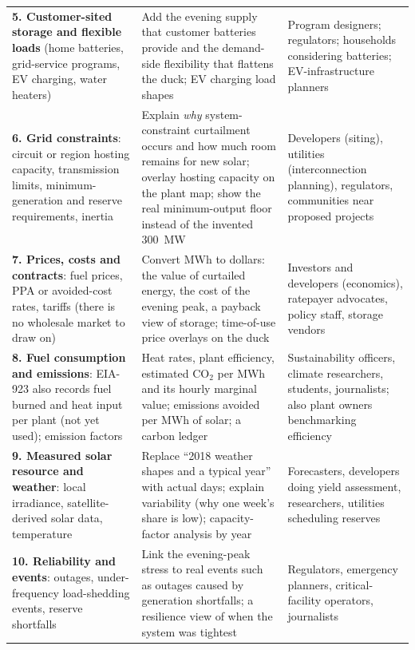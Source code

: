 \documentclass[11pt,a4paper]{article}
\begin{document}
{\begin{longtable}{@{}>{\raggedright\arraybackslash}p{3.4cm}>{\raggedright\arraybackslash}p{5.9cm}>{\raggedright\arraybackslash}p{6.0cm}@{}}
\addlinespace
\textbf{5. Customer-sited storage and flexible loads} (home batteries, grid-service programs, EV charging, water heaters) &
 Add the evening supply that customer batteries provide and the demand-side flexibility that flattens the duck; EV charging load shapes &
 Program designers; regulators; households considering batteries; EV-infrastructure planners \\
\addlinespace
\textbf{6. Grid constraints}: circuit or region hosting capacity, transmission limits, minimum-generation and reserve requirements, inertia &
 Explain \emph{why} system-constraint curtailment occurs and how much room remains for new solar; overlay hosting capacity on the plant map; show the real minimum-output floor instead of the invented 300~MW &
 Developers (siting), utilities (interconnection planning), regulators, communities near proposed projects \\
\addlinespace
\textbf{7. Prices, costs and contracts}: fuel prices, PPA or avoided-cost rates, tariffs (there is no wholesale market to draw on) &
 Convert MWh to dollars: the value of curtailed energy, the cost of the evening peak, a payback view of storage; time-of-use price overlays on the duck &
 Investors and developers (economics), ratepayer advocates, policy staff, storage vendors \\
\addlinespace
\textbf{8. Fuel consumption and emissions}: EIA-923 also records fuel burned and heat input per plant (not yet used); emission factors &
 Heat rates, plant efficiency, estimated CO$_2$ per MWh and its hourly marginal value; emissions avoided per MWh of solar; a carbon ledger &
 Sustainability officers, climate researchers, students, journalists; also plant owners benchmarking efficiency \\
\addlinespace
\textbf{9. Measured solar resource and weather}: local irradiance, satellite-derived solar data, temperature &
 Replace ``2018 weather shapes and a typical year'' with actual days; explain variability (why one week's share is low); capacity-factor analysis by year &
 Forecasters, developers doing yield assessment, researchers, utilities scheduling reserves \\
\addlinespace
\textbf{10. Reliability and events}: outages, under-frequency load-shedding events, reserve shortfalls &
 Link the evening-peak stress to real events such as outages caused by generation shortfalls; a resilience view of when the system was tightest &
 Regulators, emergency planners, critical-facility operators, journalists \\

\end{longtable}}
\end{document}
